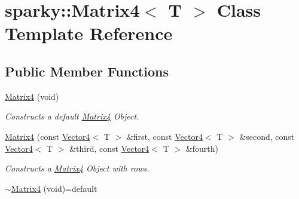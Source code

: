 \hypertarget{classsparky_1_1_matrix4}{}\section{sparky\+:\+:Matrix4$<$ T $>$ Class Template Reference}
\label{classsparky_1_1_matrix4}
\subsection*{Public Member Functions}
\begin{DoxyCompactItemize}
\item 
\hyperlink{classsparky_1_1_matrix4_a76b303e09bc5209b5b65324c4636813b}{Matrix4} (void)
\begin{DoxyCompactList}\small\item\em Constructs a default \hyperlink{classsparky_1_1_matrix4}{Matrix4} Object. \end{DoxyCompactList}\item 
\hyperlink{classsparky_1_1_matrix4_afdf7d7321512aa30cdbc66169a68c484}{Matrix4} (const \hyperlink{classsparky_1_1_vector4}{Vector4}$<$ T $>$ \&first, const \hyperlink{classsparky_1_1_vector4}{Vector4}$<$ T $>$ \&second, const \hyperlink{classsparky_1_1_vector4}{Vector4}$<$ T $>$ \&third, const \hyperlink{classsparky_1_1_vector4}{Vector4}$<$ T $>$ \&fourth)
\begin{DoxyCompactList}\small\item\em Constructs a \hyperlink{classsparky_1_1_matrix4}{Matrix4} Object with rows. \end{DoxyCompactList}\item 
\hyperlink{classsparky_1_1_matrix4_aa8147c39e8abb0490efd78336ff794cf}{$\sim$\+Matrix4} (void)=default\hypertarget{classsparky_1_1_matrix4_aa8147c39e8abb0490efd78336ff794cf}{}\label{classsparky_1_1_matrix4_aa8147c39e8abb0490efd78336ff794cf}


\end{DoxyCompactItemize}
